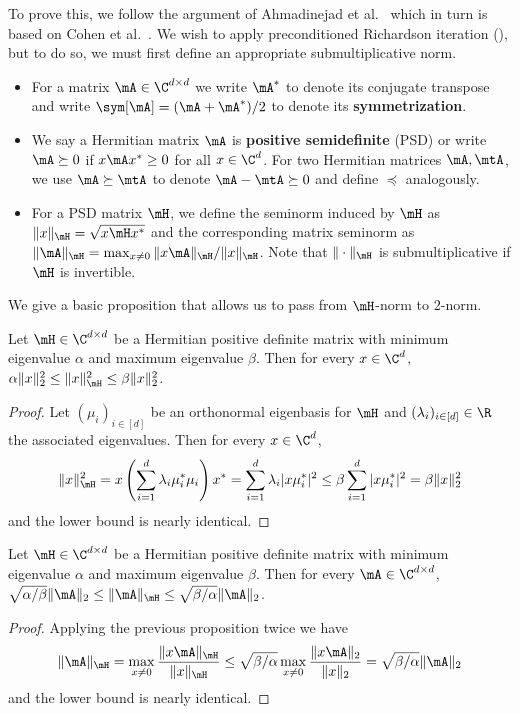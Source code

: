 To prove this, we follow the argument of %
Ahmadinejad %
et al.~\cite{AhmadinejadKeMuPeSiVa19} which in turn is based on Cohen et al.~\cite{CKPPRSV17}. We wish to apply preconditioned Richardson iteration (), but to do so, we must first define an appropriate submultiplicative
%
norm. 
\begin{itemize}
        \item For a matrix $\mA \in \C^{d \times d}$ we write $\mA^*$ to denote its conjugate transpose and write $\sym[\mA]=(\mA+\mA^*)/2$ to denote its \textbf{symmetrization}.
        \item We say a Hermitian matrix $\mA$ is \textbf{positive semidefinite} (PSD) or write $\mA \succeq 0$ if $x\mA x^*\geq 0$ for all $x \in \C^d$. For two Hermitian matrices $\mA, \mtA$, we use $\mA\succeq \mtA$ to denote $\mA-\mtA\succeq 0$ and define $\preceq$ analogously.
        \item For a PSD matrix $\mH$, we define the seminorm induced by $\mH$ as $\|x\|_\mH=\sqrt{x\mH x^*}$ and the corresponding matrix seminorm as $\|\mA\|_{\mH} = \max_{x\neq 0}\|x\mA \|_{\mH}/\|x\|_{\mH}$. Note that $\|\cdot\|_{\mH}$ is submultiplicative if $\mH$ is invertible. 
    \end{itemize}
    We give a basic proposition that allows us to pass from $\mH$-norm to $2$-norm.
    \begin{proposition}
        Let $\mH\in \C^{d\times d}$ be a Hermitian positive definite matrix with minimum eigenvalue $\alpha$ and maximum eigenvalue $\beta$. Then for every $x \in \C^d$, $\alpha \|x\|_2^2\leq \|x\|^2_\mH\leq \beta\|x\|_2^2$.
    \end{proposition}
    \begin{proof}
    Let $(\mu_i)_{i\in[d]}$ be an orthonormal eigenbasis for $\mH$ and $(\lambda_i)_{i\in [d]} \in \R$ the associated eigenvalues. Then for every $x\in \C^d$,  
    \[\|x\|^2_\mH = x\left(\sum_{i=1}^d\lambda_i\mu_i^*\mu_i\right)x^*  = \sum_{i=1}^d \lambda_i |x\mu_i^*|^2 \leq \beta \sum_{i=1}^d |x\mu_i^*|^2=\beta \|x\|_2^2\]
    and the lower bound is nearly identical.
    \end{proof}
    \begin{corollary}\label{prop:condNumber}
        Let $\mH\in \C^{d\times d}$ be a Hermitian positive definite matrix with minimum eigenvalue $\alpha$ and maximum eigenvalue $\beta$. Then for every $\mA \in \C^{d\times d}$, $\sqrt{\alpha/\beta}\|\mA\|_2\leq \|\mA\|_\mH\leq \sqrt{\beta/\alpha}\|\mA\|_2$.
    \end{corollary}
    \begin{proof}
    Applying the previous proposition twice we have
    \[\|\mA\|_{\mH} = \max_{x\neq 0}\frac{\|x\mA\|_{\mH}}{\|x\|_{\mH}}\leq \sqrt{\beta/\alpha}\max_{x\neq 0}\frac{\|x\mA\|_2}{\|x\|_2} = \sqrt{\beta/\alpha}\|\mA\|_2\]
    and the lower bound is nearly identical.
    \end{proof}
    
